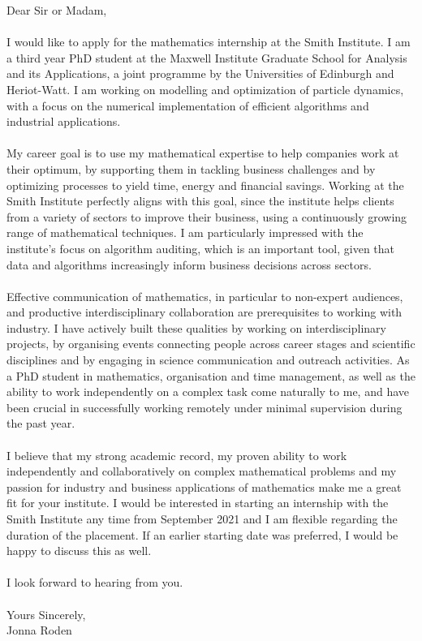 \documentclass[11pt, letterpaper]{article}
\begin{document}
\justify
\vspace{0.4 cm}
Dear Sir or Madam,\\
\\
\noindent
I would like to apply for the mathematics internship at the Smith Institute. I am a third year PhD student at the Maxwell Institute Graduate School for Analysis and its Applications, a joint programme by the Universities of Edinburgh and Heriot-Watt. I am working on modelling and optimization of particle dynamics, with a focus on the numerical implementation of efficient algorithms and industrial applications.\\
\\
\noindent
My career goal is to use my mathematical expertise to help companies work at their optimum, by supporting them in tackling business challenges and by optimizing processes to yield time, energy and financial savings. Working at the Smith Institute perfectly aligns with this goal, since the institute helps clients from a variety of sectors to improve their business, using a continuously growing range of mathematical techniques.
I am particularly impressed with the institute's focus on algorithm auditing, which is an important tool, given that data and algorithms increasingly inform business decisions across sectors.
\\
\\
\noindent
Effective communication of mathematics, in particular to non-expert audiences, and productive interdisciplinary collaboration are prerequisites to working with industry. I have actively built these qualities by working on interdisciplinary projects, by organising events connecting people across career stages and scientific disciplines and by engaging in science communication and outreach activities. As a PhD student in mathematics, organisation and time management, as well as the ability to work independently on a complex task come naturally to me, and have been crucial in successfully working remotely under minimal supervision during the past year. 
\\
\\
\noindent
I believe that my strong academic record, my proven ability to work independently and collaboratively on complex mathematical problems and my passion for industry and business applications of mathematics make me a great fit for your institute. I would be interested in starting an internship with the Smith Institute any time from September 2021 and I am flexible regarding the duration of the placement. If an earlier starting date was preferred, I would be happy to discuss this as well.
\\
\\
\noindent
I look forward to hearing from you.\\
\\
\noindent
Yours Sincerely,\\
Jonna Roden

 	
	
	
	
	
	
	
\end{document}
